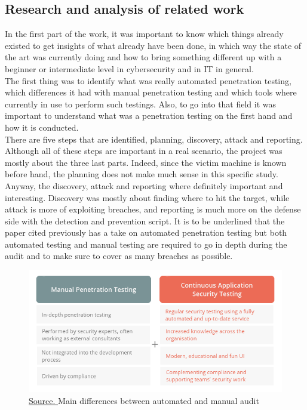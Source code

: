 \documentclass[a4paper,12pt,fleqn]{article}
\begin{document}
\subsection{Research and analysis of related work}
\label{sec:data}

In the first part of the work, it was important to know which things already existed to get insights of what already have been done, in which way the state of the art was currently doing and how to bring something different up with a beginner or intermediate level in cybersecurity and in IT in general. \\ The first thing was to identify what was really automated penetration testing, which differences it had with manual penetration testing and which tools where currently in use to perform such testings. Also, to go into that field it was important to understand what was a penetration testing on the first hand and how it is conducted. \\
There are five steps that are identified\cite{overview}, planning, discovery, attack and reporting. Although all of these steps are important in a real scenario, the project was mostly about the three last parts. Indeed, since the victim machine is known before hand, the planning does not make much sense in this specific study. Anyway, the discovery, attack and reporting where definitely important and interesting. Discovery was mostly about finding where to hit the target, while attack is more of exploiting breaches, and reporting is much more on the defense side with the detection and prevention script. It is to be underlined that the paper cited previously has a take on automated penetration testing but both automated testing and manual testing are required to go in depth during the audit and to make sure to cover as many breaches as possible.

\begin{figure}[h]
    \centering
    \includegraphics[scale = 0.6]{images/Automation_pentesting.png}
    \caption{\href{https://blog.detectify.com/wp-content/uploads/2017/08/Automation_pentesting.png}{Source. }Main differences between automated and manual audit}
\end{figure}
\end{document}
